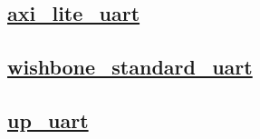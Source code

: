 \documentclass{article}
\begin{document}
  


  \subsection{\href{../files/axi_lite_uart-v.html}{axi\_lite\_uart}}

  \subsection{\href{../files/wishbone_standard_uart-v.html}{wishbone\_standard\_uart}}

  \subsection{\href{../files/up_uart-v.html}{up\_uart}}
\end{document}
